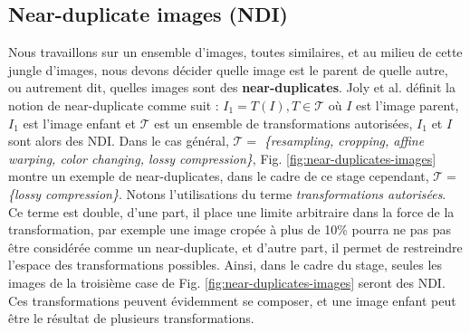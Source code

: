 \documentclass[utf8]{stageM2R} %
\begin{document}
\subsection{Near-duplicate images (NDI)}
\label{subsec:ndi}
Nous travaillons sur un ensemble d'images, toutes similaires, et au milieu de cette jungle d'images, nous devons décider quelle image est le parent de quelle autre, ou autrement dit, quelles images sont des \textbf{near-duplicates}. Joly et al. \cite{joly2007content} définit la notion de near-duplicate comme suit : $I_{1} = T(I), T \in \mathcal{T}$ où $I$ est l'image parent, $I_{1}$ est l'image enfant et $\mathcal{T}$ est un ensemble de transformations autorisées, $I_{1}$ et $I$ sont alors des NDI. Dans le cas général, $\mathcal{T} = $ \textit{\{resampling, cropping, affine warping, color changing, lossy compression\}}, Fig. \ref{fig:near-duplicates-images} montre un exemple de near-duplicates, dans le cadre de ce stage cependant, $\mathcal{T} = $ \textit{\{lossy compression\}}. Notons l'utilisations du terme \textit{transformations autorisées}. Ce terme est double, d'une part, il place une limite arbitraire dans la force de la transformation, par exemple une image cropée à plus de 10\% pourra ne pas pas être considérée comme un near-duplicate, et d'autre part, il permet de restreindre l'espace des transformations possibles. Ainsi, dans le cadre du stage, seules les images de la troisième case de Fig. \ref{fig:near-duplicates-images} seront des NDI. Ces transformations peuvent évidemment se composer, et une image enfant peut être le résultat de plusieurs transformations.
\end{document}
